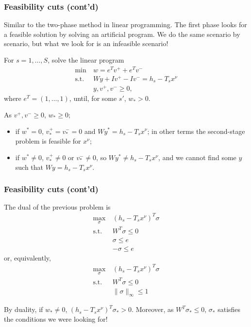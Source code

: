 \documentclass{beamer}
\begin{document}
\begin{frame}
\frametitle{Feasibility cuts (cont'd)}

Similar to the two-phase method in linear programming.
The first phase looks for a feasible solution by solving an artificial program.
We do the same scenario by scenario, but what we look for is an infeasible scenario!

\mbox{}

For $s = 1,\ldots,S$, solve the linear program
\begin{align*}
\min\ & w = e^Tv^+ + e^Tv^- \\
\mbox{s.t. } & Wy + Iv^+ - Iv^- = h_s - T_sx^{\nu} \\
& y, v^+, v^- \geq 0,
\end{align*}
where $e^T = (1,\ldots,1)$, until, for some $s'$, %
$w_* > 0$.

\mbox{}

As $v^+, v^- \geq 0$, $w_* \geq 0$;
\begin{itemize}
\item 
if $w^* = 0$, $v^+_* = v^-_* = 0$ and $Wy^* = h_s - T_sx^{\nu}$; in other terms the second-stage problem is feasible for $x^{\nu}$;
\item
if $w^* \ne 0$, $v^+_* \ne 0$ or $v^-_* \ne 0$, so $Wy^* \ne h_s - T_sx^{\nu}$, and we cannot find some $y$ such that $Wy = h_s - T_sx^{\nu}$.
\end{itemize}

\end{frame}

\begin{frame}
\frametitle{Feasibility cuts (cont'd)}

The dual of the previous problem is
\begin{align*}
\max_{\sigma}\ & (h_s - T_sx^{\nu})^T\sigma \\
\mbox{s.t. } & W^T \sigma \leq 0 \\
& \sigma \leq e \\
& -\sigma \leq e
\end{align*}
or, equivalently,
\begin{align*}
\max_{\sigma}\ & (h_s - T_sx^{\nu})^T\sigma \\
\mbox{s.t. } & W^T \sigma \leq 0 \\
& \| \sigma \|_{\infty} \leq 1
\end{align*}

By duality, if $w_* \ne 0$, $(h_s - T_sx^{\nu})^T\sigma_* > 0$.
Moreover, as $W^T \sigma_* \leq 0$, $\sigma_*$ satisfies the conditions we were looking for!
\end{frame}
\end{document}
